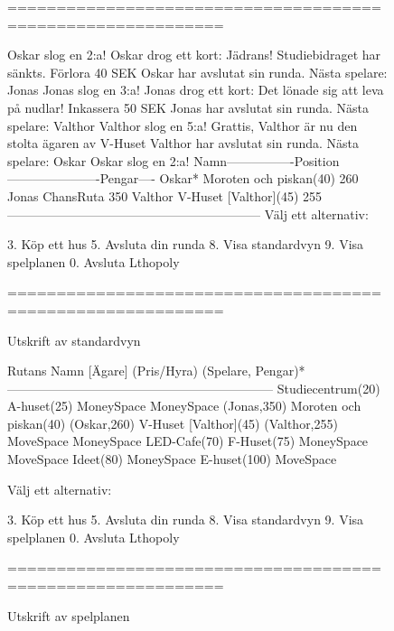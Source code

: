 \begin{figure}[H]
\centering

\begin{REPL}
============================================================

Oskar slog en 2:a!
Oskar drog ett kort: Jädrans! Studiebidraget har sänkts. Förlora 40 SEK
Oskar har avslutat sin runda.
Nästa spelare: Jonas
Jonas slog en 3:a!
Jonas drog ett kort: Det lönade sig att leva på nudlar! Inkassera 50 SEK
Jonas har avslutat sin runda.
Nästa spelare: Valthor
Valthor slog en 5:a!
Grattis, Valthor är nu den stolta ägaren av V-Huset
Valthor har avslutat sin runda.
Nästa spelare: Oskar
Oskar slog en 2:a!
Namn----------------Position----------------------Pengar----
Oskar*              Moroten och piskan(40)        260       
Jonas               ChansRuta                     350       
Valthor             V-Huset [Valthor](45)         255       
------------------------------------------------------------
Välj ett alternativ:

	3. Köp ett hus                   
	5. Avsluta din runda             
	8. Visa standardvyn              
	9. Visa spelplanen               
	0. Avsluta Lthopoly              

============================================================

\end{REPL}
\caption {Utskrift av standardvyn}
\label{fig:scalajava:lthopoly-team:defaultview}
\end{figure}

\begin{figure}[H]
\centering

\begin{REPL}
Rutans Namn [Ägare] (Pris/Hyra) (Spelare, Pengar)*
---------------------------------------------------------------
Studiecentrum(20)
A-huset(25) 
MoneySpace
MoneySpace (Jonas,350)
Moroten och piskan(40) (Oskar,260)
V-Huset [Valthor](45) (Valthor,255)
MoveSpace
MoneySpace
LED-Cafe(70)
F-Huset(75)
MoneySpace
MoveSpace
Ideet(80)
MoneySpace
E-huset(100)
MoveSpace

Välj ett alternativ:

	3. Köp ett hus                   
	5. Avsluta din runda             
	8. Visa standardvyn              
	9. Visa spelplanen               
	0. Avsluta Lthopoly              

============================================================ 
\end{REPL}

\caption {Utskrift av spelplanen}
\label{fig:scalajava:lthopoly-team:boardview}
\end{figure}

